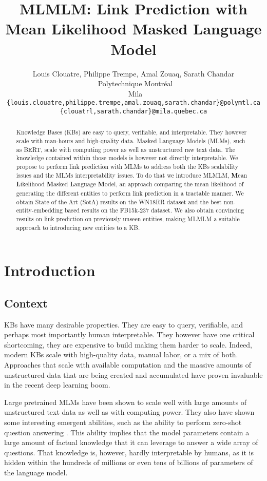 \documentclass[11pt,a4paper]{article}
\title{MLMLM: Link Prediction with Mean Likelihood Masked Language Model}
\author{Louis Clouatre, Philippe Trempe, Amal Zouaq, Sarath Chandar\\
~Polytechnique Montréal\\
~\textrm{Mila}\\
\texttt{\{louis.clouatre,philippe.trempe,amal.zouaq,sarath.chandar\}@polymtl.ca}\\
\texttt{\{clouatrl,sarath.chandar\}@mila.quebec.ca}}
\begin{document}
\maketitle

\begin{abstract}
Knowledge Bases (KBs) are easy to query, verifiable, and interpretable.
They however scale with man-hours and high-quality data.
Masked Language Models (MLMs), such as BERT, scale with computing power as well as unstructured raw text data. 
The knowledge contained within those models is however not directly interpretable.
We propose to perform link prediction with MLMs to address both the KBs scalability issues and the MLMs interpretability issues.
To do that we introduce MLMLM, \textbf{M}ean \textbf{L}ikelihood \textbf{M}asked \textbf{L}anguage \textbf{M}odel, an approach comparing the mean likelihood of generating the different entities to perform link prediction in a tractable manner.
We obtain State of the Art (SotA) results on the WN18RR dataset and the best non-entity-embedding based results on the FB15k-237 dataset.
We also obtain convincing results on link prediction on previously unseen entities, making MLMLM a suitable approach to introducing new entities to a KB. 

\end{abstract}

\section{Introduction}

\subsection{Context}



KBs have many desirable properties.
They are easy to query, verifiable, and perhaps most importantly human interpretable.
They however have one critical shortcoming, they are expensive to build making them harder to scale.
Indeed, modern KBs scale with high-quality data, manual labor, or a mix of both.
Approaches that scale with available computation and the massive amounts of unstructured data that are being created and accumulated have proven invaluable in the recent deep learning boom.


Large pretrained MLMs have been shown to scale well with large amounts of unstructured text data as well as with computing power.
They also have shown some interesting emergent abilities, such as the ability to perform zero-shot question answering .
This ability implies that the model parameters contain a large amount of factual knowledge that it can leverage to answer a wide array of questions.
That knowledge is, however, hardly interpretable by humans, as it is hidden within the hundreds of millions or even tens of billions of parameters of the language model.
\end{document}
